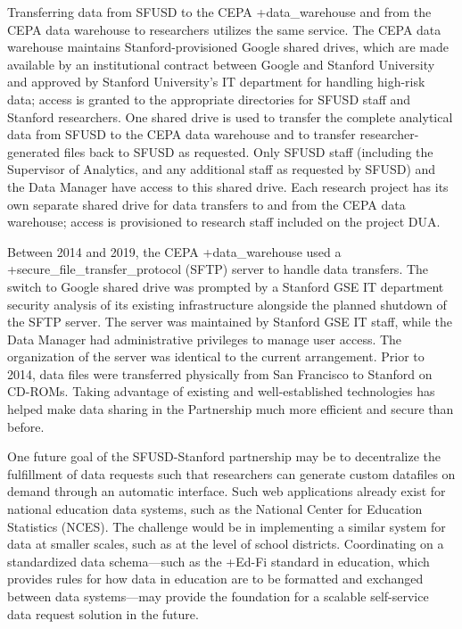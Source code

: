 \documentclass[
]{WileySix}
\begin{document}
Transferring data from SFUSD to the CEPA +data\_warehouse\textbar{} and from the CEPA data warehouse to researchers utilizes the same service. The CEPA data warehouse maintains Stanford-provisioned Google shared drives, which are made available by an institutional contract between Google and Stanford University and approved by Stanford University's IT department for handling high-risk data; access is granted to the appropriate directories for SFUSD staff and Stanford researchers. One shared drive is used to transfer the complete analytical data from SFUSD to the CEPA data warehouse and to transfer researcher-generated files back to SFUSD as requested. Only SFUSD staff (including the Supervisor of Analytics, and any additional staff as requested by SFUSD) and the Data Manager have access to this shared drive. Each research project has its own separate shared drive for data transfers to and from the CEPA data warehouse; access is provisioned to research staff included on the project DUA.

Between 2014 and 2019, the CEPA +data\_warehouse\textbar{} used a +secure\_file\_transfer\_protocol\textbar{} (SFTP) server to handle data transfers. The switch to Google shared drive was prompted by a Stanford GSE IT department security analysis of its existing infrastructure alongside the planned shutdown of the SFTP server. The server was maintained by Stanford GSE IT staff, while the Data Manager had administrative privileges to manage user access. The organization of the server was identical to the current arrangement. Prior to 2014, data files were transferred physically from San Francisco to Stanford on CD-ROMs. Taking advantage of existing and well-established technologies has helped make data sharing in the Partnership much more efficient and secure than before.

One future goal of the SFUSD-Stanford partnership may be to decentralize the fulfillment of data requests such that researchers can generate custom datafiles on demand through an automatic interface. Such web applications already exist for national education data systems, such as the National Center for Education Statistics (NCES). The challenge would be in implementing a similar system for data at smaller scales, such as at the level of school districts. Coordinating on a standardized data schema---such as the +Ed-Fi\textbar{} standard in education, which provides rules for how data in education are to be formatted and exchanged between data systems---may provide the foundation for a scalable self-service data request solution in the future.
\end{document}
